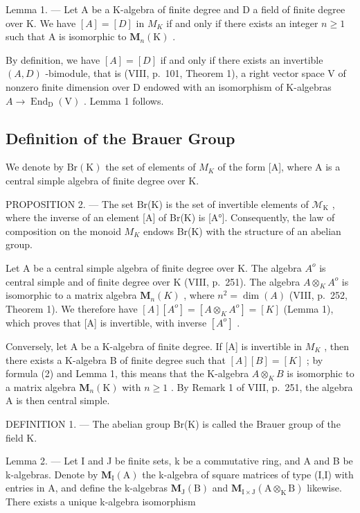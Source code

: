 Lemma 1. --- Let A be a K-algebra of finite degree and D a field of finite degree over K. We have \([A]=[D]\) in \(M_{K}\) if and only if there exists an integer \(n\geqslant1\) such that A is isomorphic to \(\mathbf{M}_{n}(\mathrm{K})\) .

By definition, we have \([A]=[D]\) if and only if there exists an invertible \((A,D)\) -bimodule, that is (VIII, p.~101, Theorem 1), a right vector space V of nonzero finite dimension over D endowed with an isomorphism of K-algebras \(A\to\operatorname{End}_{\mathrm{D}}(\mathrm{V})\) . Lemma 1 follows.

\subsection{Definition of the Brauer Group}

We denote by \(\mathrm{Br}(\mathrm{K})\) the set of elements of \(M_{K}\) of the form {[}A{]}, where A is a central simple algebra of finite degree over K.

PROPOSITION 2. --- The set Br(K) is the set of invertible elements of \(\mathcal{M}_{\mathrm{K}}\) , where the inverse of an element {[}A{]} of Br(K) is {[}A°{]}. Consequently, the law of composition on the monoid \(M_{K}\) endows Br(K) with the structure of an abelian group.

Let A be a central simple algebra of finite degree over K. The algebra \(A^{o}\) is central simple and of finite degree over K (VIII, p.~251). The algebra \(A \otimes_{K} A^{o}\) is isomorphic to a matrix algebra \(\mathbf{M}_{n}(K)\) , where \(n^{2} = \dim(A)\) (VIII, p.~252, Theorem 1). We therefore have \([A][A^{o}] = [A \otimes_{K} A^{o}] = [K]\) (Lemma 1), which proves that {[}A{]} is invertible, with inverse \([A^{o}]\) .

Conversely, let A be a K-algebra of finite degree. If {[}A{]} is invertible in \(M_{K}\) , then there exists a K-algebra B of finite degree such that \([A][B]=[K]\) ; by formula (2) and Lemma 1, this means that the K-algebra \(A \otimes_{K} B\) is isomorphic to a matrix algebra \(\mathbf{M}_{n}(\mathrm{K})\) with \(n \geqslant 1\) . By Remark 1 of VIII, p.~251, the algebra A is then central simple.

DEFINITION 1. --- The abelian group Br(K) is called the Brauer group of the field K.

Lemma 2. --- Let I and J be finite sets, k be a commutative ring, and A and B be k-algebras. Denote by \(\mathbf{M}_{\mathrm{I}}(\mathrm{A})\) the k-algebra of square matrices of type (I,I) with entries in A, and define the k-algebras \(\mathbf{M}_{\mathrm{J}}(\mathrm{B})\) and \(\mathbf{M}_{\mathrm{I}\times\mathrm{J}}(\mathrm{A}\otimes_{\mathrm{K}}\mathrm{B})\) likewise. There exists a unique k-algebra isomorphism

